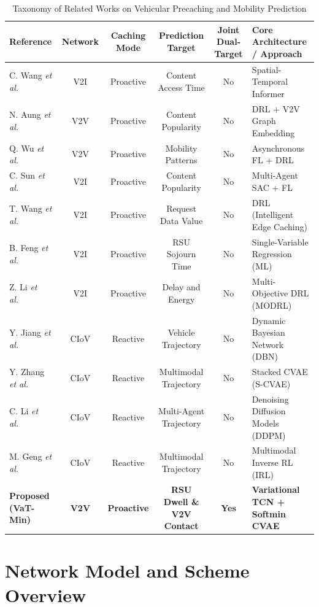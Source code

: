 \documentclass[journal]{IEEEtran}
\begin{document}
\begin{table}[!t]
\centering
\caption{Taxonomy of Related Works on Vehicular Precaching and Mobility Prediction}
\label{tab:related_work}
\begin{tabular}{@{}l c c c c L{4.5cm}@{}}
\toprule
\textbf{Reference} & \textbf{Network} & \textbf{Caching Mode} & \textbf{Prediction Target} & \textbf{Joint Dual-Target} & \textbf{Core Architecture / Approach} \\
\midrule
C. Wang \textit{et al.}~\cite{Wang2025} & V2I & Proactive & Content Access Time & No & Spatial-Temporal Informer \\
N. Aung \textit{et al.}~\cite{Aung2023} & V2V & Proactive & Content Popularity & No & DRL + V2V Graph Embedding \\
Q. Wu \textit{et al.}~\cite{QWu2023} & V2V & Proactive & Mobility Patterns & No & Asynchronous FL + DRL \\
C. Sun \textit{et al.}~\cite{Sun2023} & V2I & Proactive & Content Popularity & No & Multi-Agent SAC + FL \\
T. Wang \textit{et al.}~\cite{TWang2024} & V2I & Proactive & Request Data Value & No & DRL (Intelligent Edge Caching) \\
B. Feng \textit{et al.}~\cite{Feng2023} & V2I & Proactive & RSU Sojourn Time & No & Single-Variable Regression (ML) \\
Z. Li \textit{et al.}~\cite{ZLi2024} & V2I & Proactive & Delay and Energy & No & Multi-Objective DRL (MODRL) \\
Y. Jiang \textit{et al.}~\cite{Jiang2023} & CIoV & Reactive & Vehicle Trajectory & No & Dynamic Bayesian Network (DBN) \\
Y. Zhang \textit{et al.}~\cite{YZhang2024} & CIoV & Reactive & Multimodal Trajectory & No & Stacked CVAE (S-CVAE) \\
C. Li \textit{et al.}~\cite{CLi2025} & CIoV & Reactive & Multi-Agent Trajectory & No & Denoising Diffusion Models (DDPM) \\
M. Geng \textit{et al.}~\cite{Geng2023} & CIoV & Reactive & Multimodal Trajectory & No & Multimodal Inverse RL (IRL) \\
\textbf{Proposed (VaT-Min)} & \textbf{V2V} & \textbf{Proactive} & \textbf{RSU Dwell \& V2V Contact} & \textbf{Yes} & \textbf{Variational TCN + Softmin CVAE} \\
\bottomrule
\end{tabular}
\end{table}


\section{Network Model and Scheme Overview}\label{sec:system}
\end{document}
